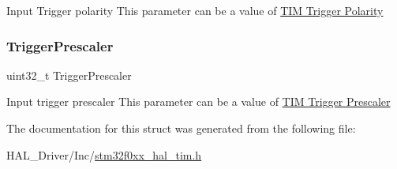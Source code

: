 Input Trigger polarity This parameter can be a value of \hyperlink{group___t_i_m___trigger___polarity}{T\+IM Trigger Polarity} \mbox{\label{struct_t_i_m___slave_config_type_def_aa2906798e3808ed40ac203a741512b55}} 
\subsubsection{\texorpdfstring{Trigger\+Prescaler}{TriggerPrescaler}}
{\footnotesize\ttfamily uint32\+\_\+t Trigger\+Prescaler}

Input trigger prescaler This parameter can be a value of \hyperlink{group___t_i_m___trigger___prescaler}{T\+IM Trigger Prescaler} 

The documentation for this struct was generated from the following file\+:\begin{DoxyCompactItemize}
\item 
H\+A\+L\+\_\+\+Driver/\+Inc/\hyperlink{stm32f0xx__hal__tim_8h}{stm32f0xx\+\_\+hal\+\_\+tim.\+h}\end{DoxyCompactItemize}
